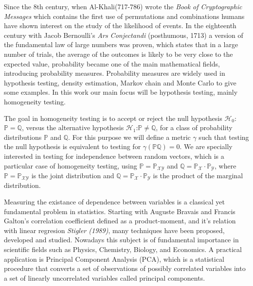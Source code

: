 Since the 8th century, when Al-Khali(717-786) wrote the \textit{Book of Cryptographic Messages} which contains the first use of permutations and combinations \cite{historia} humans have shown interest on the study of the  likelihood of events. In the eighteenth century with Jacob Bernoulli's \textit{Ars Conjectandi} (posthumous, 1713) \cite{bernoulli} a version of the fundamental law of large numbers was proven, which states that in a large number of trials, the average of the outcomes is likely to be very close to the expected value, probability became one of the main mathematical fields, introducing probability measures.  Probability measures are widely used in hypothesis testing, density estimation, Markov chain and Monte Carlo to give some examples. In this work our main focus will be hypothesis testing, mainly homogeneity testing. 

The goal in homogeneity testing is to accept or reject the null hypothesis $\mathcal{H}_{0}$:$\mathbb{P}=\mathbb{Q}$, versus the alternative hypothesis $\mathcal{H}_{1}$:$\mathbb{P}\neq\mathbb{Q}$, for a class of probability distributions $\mathbb{P}$ and $\mathbb{Q}$. For this purpose we will define a metric $\gamma$ such that testing the null hypothesis is equivalent to testing for $\gamma(\mathbb{P}\mathbb{Q}) = 0$. We are specially interested in testing for independence between random vectors, which is a particular case of homogeneity testing, using $\mathbb{P} = \mathbb{P}_{\mathcal{XY}}$ and $\mathbb{Q} = \mathbb{P}_{\mathcal{X}}\cdot\mathbb{P}_{\mathcal{Y}}$, where $\mathbb{P} =\mathbb{P}_{\mathcal{XY}}$ is the joint distribution and  $\mathbb{Q} = \mathbb{P}_{\mathcal{X}}\cdot\mathbb{P}_{\mathcal{Y}}$ is the product of the marginal distribution.

Measuring the existance of dependence between variables is a classical yet fundamental problem in statistics. Starting with Auguste Bravais and Francis Galton's correlation coefficient defined as a product-moment, and it's relation with linear regresion \textit{Stigler (1989)},  many  techniques  have  been proposed, developed and studied. Nowadays this subject is of fundamental importance in scientific fields such as Physics, Chemistry, Biology, and Economics. A practical application is Principal Component Analysis (PCA), which is a statistical procedure that converts a set of observations of possibly correlated variables into a set of linearly uncorrelated variables called principal components. 

